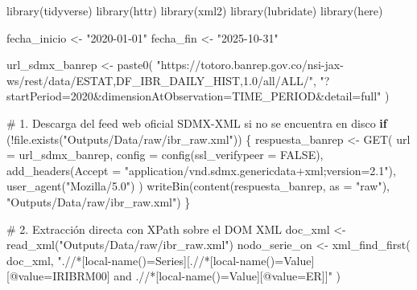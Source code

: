 \documentclass[
  10pt,
  letterpaper,
  DIV=11,
  numbers=noendperiod]{scrartcl}
\newenvironment{Shaded}{\begin{snugshade}}{\end{snugshade}}
\newcommand{\AttributeTok}[1]{\textcolor[rgb]{0.40,0.45,0.13}{#1}}
\newcommand{\CommentTok}[1]{\textcolor[rgb]{0.37,0.37,0.37}{#1}}
\newcommand{\ConstantTok}[1]{\textcolor[rgb]{0.56,0.35,0.01}{#1}}
\newcommand{\ControlFlowTok}[1]{\textcolor[rgb]{0.00,0.23,0.31}{\textbf{#1}}}
\newcommand{\FunctionTok}[1]{\textcolor[rgb]{0.28,0.35,0.67}{#1}}
\newcommand{\NormalTok}[1]{\textcolor[rgb]{0.00,0.23,0.31}{#1}}
\newcommand{\OtherTok}[1]{\textcolor[rgb]{0.00,0.23,0.31}{#1}}
\newcommand{\SpecialCharTok}[1]{\textcolor[rgb]{0.37,0.37,0.37}{#1}}
\newcommand{\StringTok}[1]{\textcolor[rgb]{0.13,0.47,0.30}{#1}}
\begin{document}
\begin{Shaded}
\begin{Highlighting}[]
\FunctionTok{library}\NormalTok{(tidyverse)}
\FunctionTok{library}\NormalTok{(httr)}
\FunctionTok{library}\NormalTok{(xml2)}
\FunctionTok{library}\NormalTok{(lubridate)}
\FunctionTok{library}\NormalTok{(here)}

\NormalTok{fecha\_inicio }\OtherTok{\textless{}{-}} \StringTok{"2020{-}01{-}01"}
\NormalTok{fecha\_fin    }\OtherTok{\textless{}{-}} \StringTok{"2025{-}10{-}31"}

\NormalTok{url\_sdmx\_banrep }\OtherTok{\textless{}{-}} \FunctionTok{paste0}\NormalTok{(}
  \StringTok{"https://totoro.banrep.gov.co/nsi{-}jax{-}ws/rest/data/ESTAT,DF\_IBR\_DAILY\_HIST,1.0/all/ALL/"}\NormalTok{,}
  \StringTok{"?startPeriod=2020\&dimensionAtObservation=TIME\_PERIOD\&detail=full"}
\NormalTok{)}

\CommentTok{\# 1. Descarga del feed web oficial SDMX{-}XML si no se encuentra en disco}
\ControlFlowTok{if}\NormalTok{ (}\SpecialCharTok{!}\FunctionTok{file.exists}\NormalTok{(}\StringTok{"Outputs/Data/raw/ibr\_raw.xml"}\NormalTok{)) \{}
\NormalTok{  respuesta\_banrep }\OtherTok{\textless{}{-}} \FunctionTok{GET}\NormalTok{(}
    \AttributeTok{url =}\NormalTok{ url\_sdmx\_banrep,}
    \AttributeTok{config =} \FunctionTok{config}\NormalTok{(}\AttributeTok{ssl\_verifypeer =} \ConstantTok{FALSE}\NormalTok{),}
    \FunctionTok{add\_headers}\NormalTok{(}\AttributeTok{Accept =} \StringTok{"application/vnd.sdmx.genericdata+xml;version=2.1"}\NormalTok{),}
    \FunctionTok{user\_agent}\NormalTok{(}\StringTok{"Mozilla/5.0"}\NormalTok{)}
\NormalTok{  )}
  \FunctionTok{writeBin}\NormalTok{(}\FunctionTok{content}\NormalTok{(respuesta\_banrep, }\AttributeTok{as =} \StringTok{"raw"}\NormalTok{), }\StringTok{"Outputs/Data/raw/ibr\_raw.xml"}\NormalTok{)}
\NormalTok{\}}

\CommentTok{\# 2. Extracción directa con XPath sobre el DOM XML}
\NormalTok{doc\_xml }\OtherTok{\textless{}{-}} \FunctionTok{read\_xml}\NormalTok{(}\StringTok{"Outputs/Data/raw/ibr\_raw.xml"}\NormalTok{)}
\NormalTok{nodo\_serie\_on }\OtherTok{\textless{}{-}} \FunctionTok{xml\_find\_first}\NormalTok{(}
\NormalTok{  doc\_xml,}
  \StringTok{".//*[local{-}name()=\textquotesingle{}Series\textquotesingle{}][.//*[local{-}name()=\textquotesingle{}Value\textquotesingle{}][@value=\textquotesingle{}IRIBRM00\textquotesingle{}] and .//*[local{-}name()=\textquotesingle{}Value\textquotesingle{}][@value=\textquotesingle{}ER\textquotesingle{}]]"}
\NormalTok{)}


\end{Highlighting}
\end{Shaded}
\end{document}
